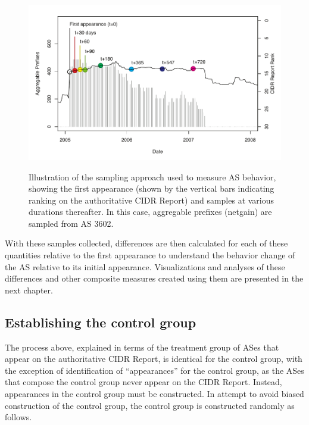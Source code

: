 \begin{figure}[h!]
\begin{centering}
    \includegraphics[width=6in]{figures/single_as.pdf}
    \vspace{-2em}\\
    \caption[Illustration of the sampling approach used to measure AS behavior]{Illustration of the sampling approach used to measure AS behavior, showing the first appearance (shown by the vertical bars indicating ranking on the authoritative CIDR Report) and samples at various durations thereafter. In this case, aggregable prefixes (netgain) are sampled from AS 3602.}
    \label{fig:sample_ex}
\end{centering}
\end{figure}

With these samples collected, differences are then calculated for each of these quantities relative to the first appearance to understand the behavior change of the AS relative to its initial appearance. Visualizations and analyses of these differences and other composite measures created using them are presented in the next chapter.

\subsection{Establishing the control group}

The process above, explained in terms of the treatment group of ASes that appear on the authoritative CIDR Report, is identical for the control group, with the exception of identification of ``appearances'' for the control group, as the ASes that compose the control group never appear on the CIDR Report. Instead, appearances in the control group must be constructed. In attempt to avoid biased construction of the control group, the control group is constructed randomly as follows.

